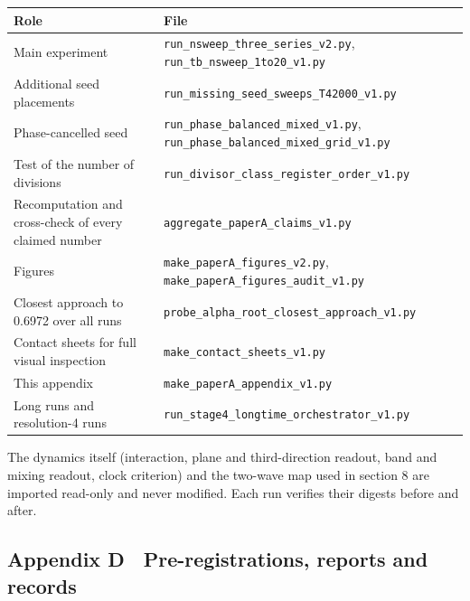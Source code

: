\documentclass[
]{article}
\newcounter{none} %
\begin{document}
{\def\LTcaptype{none} %
\begin{longtable}[]{@{}
  >{\raggedright\arraybackslash}p{}
  >{\raggedright\arraybackslash}p{}@{}}
\toprule\noalign{}
\begin{minipage}[b]{\linewidth}\raggedright
Role
\end{minipage} & \begin{minipage}[b]{\linewidth}\raggedright
File
\end{minipage} \\
\midrule\noalign{}
\endhead
\bottomrule\noalign{}
\endlastfoot
Main experiment & \texttt{run\_nsweep\_three\_series\_v2.py},
\texttt{run\_tb\_nsweep\_1to20\_v1.py} \\
Additional seed placements &
\texttt{run\_missing\_seed\_sweeps\_T42000\_v1.py} \\
Phase-cancelled seed & \texttt{run\_phase\_balanced\_mixed\_v1.py},
\texttt{run\_phase\_balanced\_mixed\_grid\_v1.py} \\
Test of the number of divisions &
\texttt{run\_divisor\_class\_register\_order\_v1.py} \\
Recomputation and cross-check of every claimed number &
\texttt{aggregate\_paperA\_claims\_v1.py} \\
Figures & \texttt{make\_paperA\_figures\_v2.py},
\texttt{make\_paperA\_figures\_audit\_v1.py} \\
Closest approach to 0.6972 over all runs &
\texttt{probe\_alpha\_root\_closest\_approach\_v1.py} \\
Contact sheets for full visual inspection &
\texttt{make\_contact\_sheets\_v1.py} \\
This appendix & \texttt{make\_paperA\_appendix\_v1.py} \\
Long runs and resolution-4 runs &
\texttt{run\_stage4\_longtime\_orchestrator\_v1.py} \\
\end{longtable}
}

The dynamics itself (interaction, plane and third-direction readout,
band and mixing readout, clock criterion) and the two-wave map used in
section 8 are imported read-only and never modified. Each run verifies
their digests before and after.

\subsection{Appendix D　Pre-registrations, reports and
records}\label{appendix-d-pre-registrations-reports-and-records}
\end{document}
